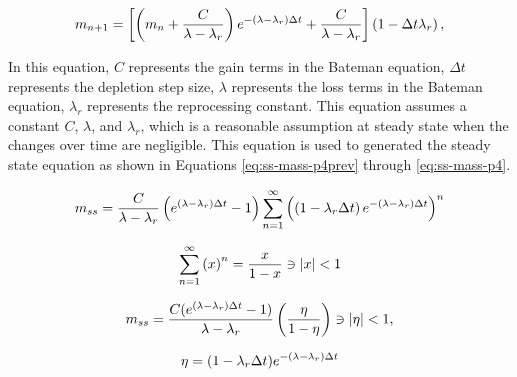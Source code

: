\begin{equation} \hfill
m_{n+1} = \left[ \left(m_n + \frac{C}{\lambda - \lambda_r} \right)e^{-(\lambda - \lambda_r) \Delta t} + \frac{C}{\lambda - \lambda_r} \right] \left(1 - \Delta t \lambda_r \right),
\hfill\label{eq:nplusone-gen} \end{equation}

In this equation, $C$ represents the gain terms in the Bateman equation, $\Delta t$ represents the depletion step size, $\lambda$ represents the loss terms in the Bateman equation, $\lambda_r$ represents the reprocessing constant. This equation assumes a constant $C$, $\lambda$, and $\lambda_r$, which is a reasonable assumption at steady state when the changes over time are negligible. This equation is used to generated the steady state equation as shown in Equations \eqref{eq:ss-mass-p4prev} through \eqref{eq:ss-mass-p4}.


\begin{equation} \hfill
m_{ss} =  \frac{C}{\lambda - \lambda_r} \left(e^{(\lambda - \lambda_r) \Delta t} - 1 \right) \sum_{n=1}^{\infty} \left( \left(1 - \lambda_r \Delta t \right) e^{-(\lambda - \lambda_r) \Delta t} \right)^n
\hfill\label{eq:ss-mass-p4prev} \end{equation}

\begin{equation} \hfill
\sum_{n=1}^\infty \left( x \right)^n = \frac{x}{1-x} \ni |x| < 1
\hfill\label{eq:ss-mass-p4next} \end{equation}

\begin{equation} \hfill
m_{ss} =  \frac{C (e^{(\lambda - \lambda_r) \Delta t} - 1)}{\lambda - \lambda_r}  \left( \frac{\eta}{1 - \eta} \right) \ni \left|\eta \right| < 1,
\hfill\label{eq:ss-mass-p4nextprev} \end{equation}

\begin{equation} \hfill
\eta = (1 - \lambda_r \Delta t) e^{-(\lambda - \lambda_r) \Delta t}
\hfill\label{eq:ss-mass-p4next-simple} \end{equation}

